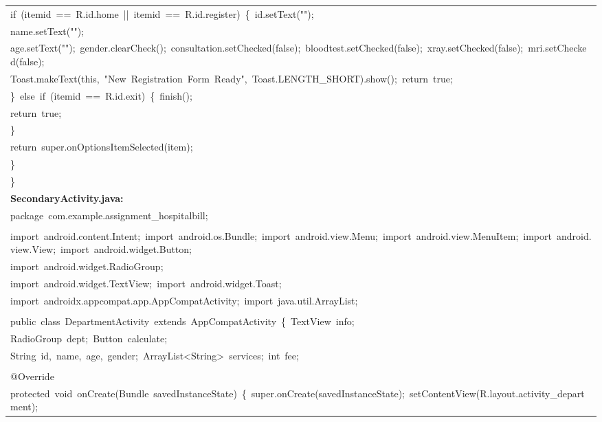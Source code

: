 \documentclass[a4paper,12pt]{article}
\begin{document}
\begin{longtable}{|p{}|}
{\ttfamily\small if\ (itemid\ ==\ R.id.home\ ||\ itemid\ ==\ R.id.register)\ \{\ id.setText("");} \\
{\ttfamily\small name.setText("");} \\
{\ttfamily\small age.setText("");\ gender.clearCheck();\ consultation.setChecked(false);\ bloodtest.setChecked(false);\ xray.setChecked(false);\ mri.setChecked(false);} \\
{\ttfamily\small Toast.makeText(this,\ "New\ Registration\ Form\ Ready",\ Toast.LENGTH\_SHORT).show();\ return\ true;} \\
{\ttfamily\small \}\ else\ if\ (itemid\ ==\ R.id.exit)\ \{\ finish();} \\
{\ttfamily\small return\ true;} \\
{\ttfamily\small \}} \\
{\ttfamily\small return\ super.onOptionsItemSelected(item);} \\
{\ttfamily\small \}} \\
{\ttfamily\small \}} \\
\hline
\rule{0pt}{13pt}\textbf{SecondaryActivity.java:} \\
\hline
{\ttfamily\small package\ com.example.assignment\_hospitalbill;} \\
\strut \\
{\ttfamily\small import\ android.content.Intent;\ import\ android.os.Bundle;\ import\ android.view.Menu;\ import\ android.view.MenuItem;\ import\ android.view.View;\ import\ android.widget.Button;} \\
{\ttfamily\small import\ android.widget.RadioGroup;} \\
{\ttfamily\small import\ android.widget.TextView;\ import\ android.widget.Toast;} \\
{\ttfamily\small import\ androidx.appcompat.app.AppCompatActivity;\ import\ java.util.ArrayList;} \\
\strut \\
{\ttfamily\small public\ class\ DepartmentActivity\ extends\ AppCompatActivity\ \{\ TextView\ info;} \\
{\ttfamily\small RadioGroup\ dept;\ Button\ calculate;} \\
{\ttfamily\small String\ id,\ name,\ age,\ gender;\ ArrayList\textless{}String\textgreater{}\ services;\ int\ fee;} \\
\strut \\
{\ttfamily\small @Override} \\
{\ttfamily\small protected\ void\ onCreate(Bundle\ savedInstanceState)\ \{\ super.onCreate(savedInstanceState);\ setContentView(R.layout.activity\_department);} \\

\end{longtable}
\end{document}
